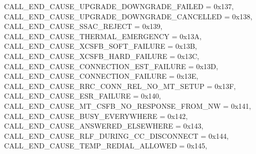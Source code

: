 \begin{DoxyItemize}
 C\+A\+L\+L\+\_\+\+E\+N\+D\+\_\+\+C\+A\+U\+S\+E\+\_\+\+U\+P\+G\+R\+A\+D\+E\+\_\+\+D\+O\+W\+N\+G\+R\+A\+D\+E\+\_\+\+F\+A\+I\+L\+ED = 0x137,~\newline
 C\+A\+L\+L\+\_\+\+E\+N\+D\+\_\+\+C\+A\+U\+S\+E\+\_\+\+U\+P\+G\+R\+A\+D\+E\+\_\+\+D\+O\+W\+N\+G\+R\+A\+D\+E\+\_\+\+C\+A\+N\+C\+E\+L\+L\+ED = 0x138,~\newline
 C\+A\+L\+L\+\_\+\+E\+N\+D\+\_\+\+C\+A\+U\+S\+E\+\_\+\+S\+S\+A\+C\+\_\+\+R\+E\+J\+E\+CT = 0x139,~\newline
 C\+A\+L\+L\+\_\+\+E\+N\+D\+\_\+\+C\+A\+U\+S\+E\+\_\+\+T\+H\+E\+R\+M\+A\+L\+\_\+\+E\+M\+E\+R\+G\+E\+N\+CY = 0x13A,~\newline
 C\+A\+L\+L\+\_\+\+E\+N\+D\+\_\+\+C\+A\+U\+S\+E\+\_\+X\+C\+S\+F\+B\+\_\+\+S\+O\+F\+T\+\_\+\+F\+A\+I\+L\+U\+RE = 0x13B,~\newline
 C\+A\+L\+L\+\_\+\+E\+N\+D\+\_\+\+C\+A\+U\+S\+E\+\_\+X\+C\+S\+F\+B\+\_\+\+H\+A\+R\+D\+\_\+\+F\+A\+I\+L\+U\+RE = 0x13C,~\newline
 C\+A\+L\+L\+\_\+\+E\+N\+D\+\_\+\+C\+A\+U\+S\+E\+\_\+\+C\+O\+N\+N\+E\+C\+T\+I\+O\+N\+\_\+\+E\+S\+T\+\_\+\+F\+A\+I\+L\+U\+RE = 0x13D,~\newline
 C\+A\+L\+L\+\_\+\+E\+N\+D\+\_\+\+C\+A\+U\+S\+E\+\_\+\+C\+O\+N\+N\+E\+C\+T\+I\+O\+N\+\_\+\+F\+A\+I\+L\+U\+RE = 0x13E,~\newline
 C\+A\+L\+L\+\_\+\+E\+N\+D\+\_\+\+C\+A\+U\+S\+E\+\_\+\+R\+R\+C\+\_\+\+C\+O\+N\+N\+\_\+\+R\+E\+L\+\_\+\+N\+O\+\_\+\+M\+T\+\_\+\+S\+E\+T\+UP = 0x13F,~\newline
 C\+A\+L\+L\+\_\+\+E\+N\+D\+\_\+\+C\+A\+U\+S\+E\+\_\+\+E\+S\+R\+\_\+\+F\+A\+I\+L\+U\+RE = 0x140,~\newline
 C\+A\+L\+L\+\_\+\+E\+N\+D\+\_\+\+C\+A\+U\+S\+E\+\_\+\+M\+T\+\_\+\+C\+S\+F\+B\+\_\+\+N\+O\+\_\+\+R\+E\+S\+P\+O\+N\+S\+E\+\_\+\+F\+R\+O\+M\+\_\+\+NW = 0x141,~\newline
 C\+A\+L\+L\+\_\+\+E\+N\+D\+\_\+\+C\+A\+U\+S\+E\+\_\+\+B\+U\+S\+Y\+\_\+\+E\+V\+E\+R\+Y\+W\+H\+E\+RE = 0x142,~\newline
 C\+A\+L\+L\+\_\+\+E\+N\+D\+\_\+\+C\+A\+U\+S\+E\+\_\+\+A\+N\+S\+W\+E\+R\+E\+D\+\_\+\+E\+L\+S\+E\+W\+H\+E\+RE = 0x143,~\newline
 C\+A\+L\+L\+\_\+\+E\+N\+D\+\_\+\+C\+A\+U\+S\+E\+\_\+\+R\+L\+F\+\_\+\+D\+U\+R\+I\+N\+G\+\_\+\+C\+C\+\_\+\+D\+I\+S\+C\+O\+N\+N\+E\+CT = 0x144,~\newline
 C\+A\+L\+L\+\_\+\+E\+N\+D\+\_\+\+C\+A\+U\+S\+E\+\_\+\+T\+E\+M\+P\+\_\+\+R\+E\+D\+I\+A\+L\+\_\+\+A\+L\+L\+O\+W\+ED = 0x145,~\newline

\end{DoxyItemize}
